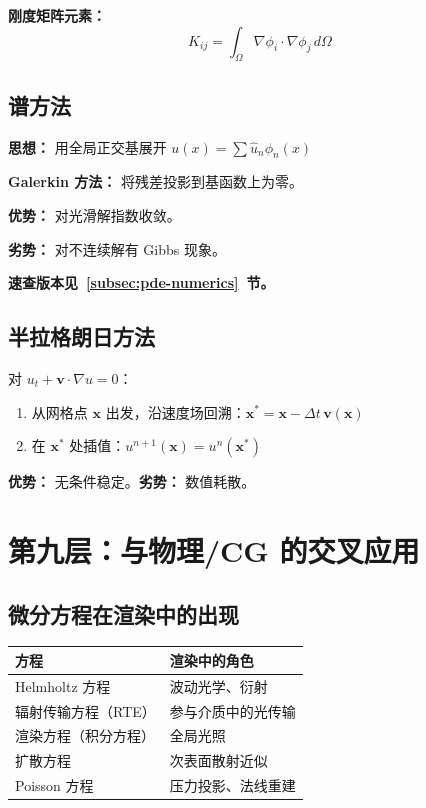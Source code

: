 \textbf{刚度矩阵元素：}
\[
K_{ij} = \int_\Omega \nabla\phi_i \cdot \nabla\phi_j\,d\Omega
\]

\subsection{谱方法}

\textbf{思想：} 用全局正交基展开 $u(x) = \sum \hat{u}_n \phi_n(x)$

\textbf{Galerkin 方法：} 将残差投影到基函数上为零。

\textbf{优势：} 对光滑解指数收敛。

\textbf{劣势：} 对不连续解有 Gibbs 现象。

\textbf{速查版本见~\ref{subsec:pde-numerics}~节。}

\subsection{半拉格朗日方法}

对 $u_t + \mathbf{v}\cdot\nabla u = 0$：
\begin{enumerate}
  \item 从网格点 $\mathbf{x}$ 出发，沿速度场回溯：$\mathbf{x}^* = \mathbf{x} - \Delta t\,\mathbf{v}(\mathbf{x})$
  \item 在 $\mathbf{x}^*$ 处插值：$u^{n+1}(\mathbf{x}) = u^n(\mathbf{x}^*)$
\end{enumerate}

\textbf{优势：} 无条件稳定。\textbf{劣势：} 数值耗散。

\section{第九层：与物理/CG 的交叉应用}

\subsection{微分方程在渲染中的出现}

\begin{center}
\begin{tabular}{L{4cm}L{5cm}}
\toprule
\textbf{方程} & \textbf{渲染中的角色} \\
\midrule
Helmholtz 方程 & 波动光学、衍射 \\
辐射传输方程（RTE） & 参与介质中的光传输 \\
渲染方程（积分方程） & 全局光照 \\
扩散方程 & 次表面散射近似 \\
Poisson 方程 & 压力投影、法线重建 \\
\bottomrule
\end{tabular}
\end{center}

